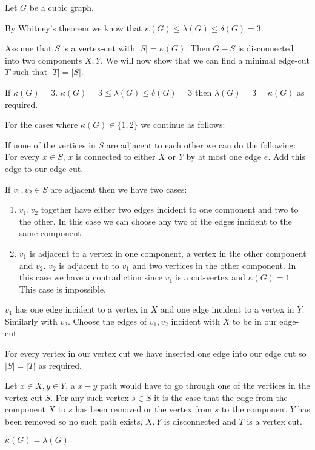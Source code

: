 Let $G$ be a cubic graph. 

By Whitney's theorem we know that $\kappa(G) \le \lambda(G) \le \delta(G) = 3 $.

Assume that $S$ is a vertex-cut with $|S| = \kappa(G)$. Then
$G-S$ is disconnected into two components $X, Y$. 
We will now show that we can find a minimal edge-cut $T$ such that $|T| = |S|$.

If $\kappa(G) = 3$. $\kappa(G) = 3 \le \lambda(G) \le \delta(G) = 3$
then $\lambda(G) = 3 = \kappa(G)$ as required.

For the cases where $\kappa(G) \in \{1, 2\}$ we continue as follows:

If none of the vertices in $S$ are adjacent to each other we can do the following:
For every $x \in S$, $x$ is connected to either $X$ or $Y$ by at most one edge $e$. 
Add this edge to our edge-cut.

If $v_1, v_2 \in S$ are adjacent then we have two cases:
\begin{enumerate}
    \item $v_1, v_2$ together have either two edges
incident to one component and two to the other. In this case we can choose any two of the edges
incident to the same component.
    \item $v_1$ is adjacent to a vertex in one component, a vertex in the 
        other component and $v_2$. $v_2$ is adjacent to to $v_1$ and 
        two vertices in the other component. In this case we have a contradiction
    since $v_1$ is a cut-vertex and $\kappa(G) = 1$. This case is impossible. 
\end{enumerate}

$v_1$ has one edge incident to a vertex 
in $X$ and one edge incident to a vertex in $Y$. Similarly with $v_2$. Choose 
the edges of $v_1, v_2$ incident with $X$ to be in our edge-cut. 

For every vertex in our vertex cut we have inserted one edge into our edge
cut so $|S| = |T|$ as required. 

Let $x\in X, y \in Y$, a $x-y$ path would have to go through one of the
vertices in the vertex-cut $S$. For any such vertex $s \in S$ it is the
case that the edge from the component $X$ to $s$ has been removed or the
vertex from $s$ to the component $Y$ has been removed so no such path
exists, $X, Y$ is disconnected and $T$ is a vertex cut. 

$\kappa(G) = \lambda(G)$
